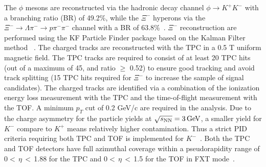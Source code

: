 \documentclass[%
 reprint,	
showpacs,
 amsmath,amssymb,
 aps,
 superscriptaddress,
]{revtex4-1}
\begin{document}
The $\phi$ mesons are reconstructed via the hadronic decay channel $\phi\rightarrow K^+K^-$ with a branching ratio (BR) of 49.2\%, while the $\Xi^{-}$ hyperons via the $\Xi^-\rightarrow \Lambda\pi^-\rightarrow p\pi^-\pi^-$ channel with a BR of 63.8\%~\cite{pdg}. $\Xi^-$ reconstruction are performed using the KF Particle Finder package based on the Kalman Filter method
~\cite{Kisel:2018nvd}. The charged tracks are reconstructed with the TPC in a 0.5 T uniform magnetic field. The TPC tracks are required to consist of at least 20 TPC hits (out of a maximum of 45, and ratio $\geq$ 0.52) to ensure good tracking and avoid track splitting (15 TPC hits required for $\Xi^{-}$ to increase the sample of signal candidates). The charged tracks are identified via a combination of the ionization energy loss %
measurement with the TPC and the time-of-flight %
measurement with the TOF. A minimum $p_T$ cut of 0.2 GeV/c are required in the analysis.
Due to the charge asymmetry for the particle yields at ${\sqrt{s_{\rm NN}} = \rm{3\,GeV}}$, a smaller yield for $K^-$ compare to $K^+$ means relatively higher contamination. Thus a strict PID criteria requiring both TPC and TOF is implemented for $K^-$~\cite{Xu:2008th,Shao:2005iu}. Both the TPC and TOF detectors have full azimuthal coverage within a pseudorapidity range of 0$<$\,$\eta$\,$<$\,1.88 for the TPC and 0$<$\,$\eta$\,$<$\,1.5 for the TOF in FXT mode~\cite{TPC,TOF}.
\end{document}
